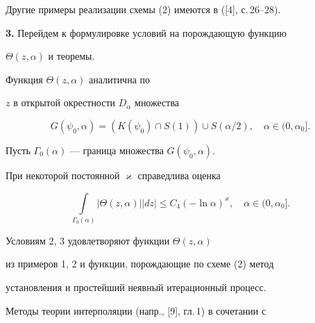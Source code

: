 Другие примеры реализации схемы (2) имеются в ([4], с.\,26--28).


\medskip








{\bf 3.} Перейдем к формулировке условий на порождающую функцию 


$\Theta(z,\alpha)$ и теоремы.








\begin{cond}


Функция $\Theta(z,\alpha)$ аналитична по


$z$ в открытой окрестности $D_{\alpha}$ множества


$$


G(\psi_0,\alpha)=


(K(\psi_0)\cap S(1))\cup S(\alpha/2),\quad \alpha\in(0,\alpha_0].


$$


\end{cond}





Пусть $\Gamma_0(\alpha)$ --- граница множества $G(\psi_0,\alpha)$.








\begin{cond}


При некоторой постоянной $\varkappa$ справедлива оценка


$$


\int\limits_{\Gamma_0(\alpha)}|\Theta(z,\alpha)||


dz|\leq C_4 (-\ln\alpha)^{\varkappa},\quad\alpha\in(0,\alpha_0].


$$


\end{cond}





Условиям 2, 3 удовлетворяют функции $\Theta(z,\alpha)$


из примеров 1, 2 и функции, порождающие по схеме (2) метод


установления и простейший неявный итерационный процесс.





Методы теории интерполяции (напр., [9], гл.\,1) в сочетании с


